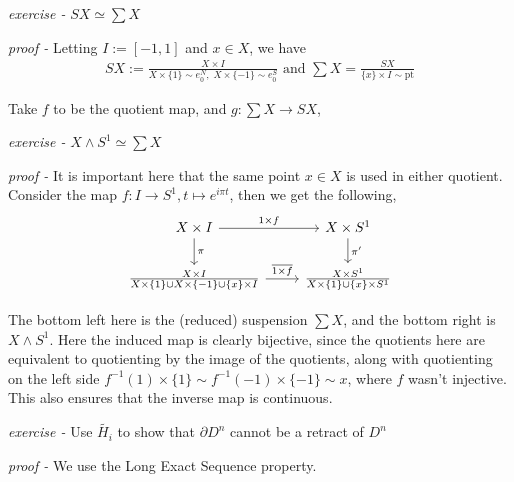 \documentclass[11pt]{article}
\theoremstyle{definition}
\newcommand{\set}[1]{\{#1\}}
\newcommand{\tand}{\text{ and }}
\begin{document}
    \emph{exercise - }\label{HEx8} \(SX \simeq \sum X\)

    \emph{proof - } Letting \(I := [-1,1]\) and \(x \in X\), we have 
    \begin{align*}
        SX := \frac{X \times I}{X \times\set{1} \sim e_0^N, \; X \times \set{-1} \sim e_0^S} \tand \sum X = \frac{SX}{\set{x} \times I \sim \text{pt}}
    \end{align*}

    Take \(f\) to be the quotient map, and \(g: \sum X \to SX\), 


    \emph{exercise - }\label{HEx9} \(X \wedge S^1 \simeq \sum X\)

    \emph{proof - } It is important here that the same point \(x \in X\) is used in either quotient. Consider the map \(f: I \to S^1, t \mapsto e^{i\pi t}\), then we get the following,
    \begin{equation*}
        \begin{tikzcd}
            X \times I \arrow[d,"{\pi}"] \arrow[r,"{1 \times f}"] & X \times S^1 \arrow[d,"{\pi'}"] \\
            \frac{X \times I}{X \times \set{1} \cup X \times \set{-1} \cup \set{x}\times I} \arrow[r,"{\overline{1 \times f}}"] &\frac{X \times S^1}{X\times \set{1} \cup \set{x} \times S^1}
        \end{tikzcd}
    \end{equation*}

    The bottom left here is the (reduced) suspension \(\sum X\), and the bottom right is \(X \wedge S^1\). Here the induced map is clearly bijective, since the quotients here are equivalent to quotienting by the image of the quotients, along with quotienting on the left side \(f^{-1}(1) \times \set{1} \sim f^{-1}(-1) \times \set{-1} \sim x\), where \(f\) wasn't injective. This also ensures that the inverse map is continuous.


    \emph{exercise - }\label{HEx10} Use \(\tilde{H_i}\) to show that \(\partial D^n\) cannot be a retract of \(D^n\)

    \emph{proof - } We use the Long Exact Sequence property.
\end{document}
